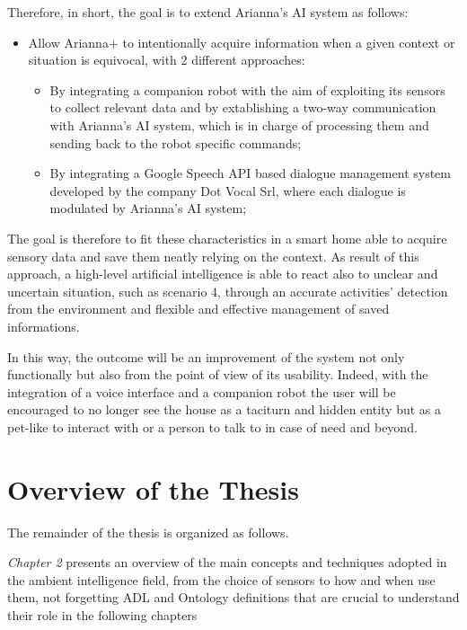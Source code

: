 \documentclass{thesisreport}
\begin{document}
 Therefore, in short, the goal is to extend Arianna's AI system as follows:
 \begin{itemize}
     \item Allow Arianna+ to intentionally acquire information when a given context or situation is equivocal, with 2 different approaches:
     \begin{itemize}
         \item By integrating a companion robot with the aim of exploiting its sensors to collect relevant data and by extablishing a two-way communication with Arianna’s AI system, which is in charge of processing them and sending back to the robot specific commands;
         \item By integrating a Google Speech API based dialogue management system developed by the company Dot Vocal Srl, where each dialogue is modulated by Arianna’s AI system; 
     \end{itemize}
 \end{itemize}

 The goal is therefore to fit these characteristics in a smart home able to acquire sensory data and save them neatly relying on the context. As result of this approach, a high-level artificial intelligence is able to react also to unclear and uncertain situation, such as scenario 4, through an accurate activities’ detection from the environment and flexible and effective management of saved informations.
 
 In this way, the outcome will be an improvement of the system not only functionally but also from the point of view of its usability.
 Indeed, with the integration of a voice interface and a companion robot the user will be encouraged to no longer see the house as a taciturn and hidden entity but as a pet-like to interact with or a person to talk to in case of need and beyond.
 
\section{Overview of the Thesis}
The remainder of the thesis is organized as follows. 

\quad \textit{Chapter 2} presents an overview of the main concepts and techniques adopted in the ambient intelligence field, from the choice of sensors to how and when use them, not forgetting ADL and Ontology definitions that are crucial to understand their role in the following chapters
\end{document}
